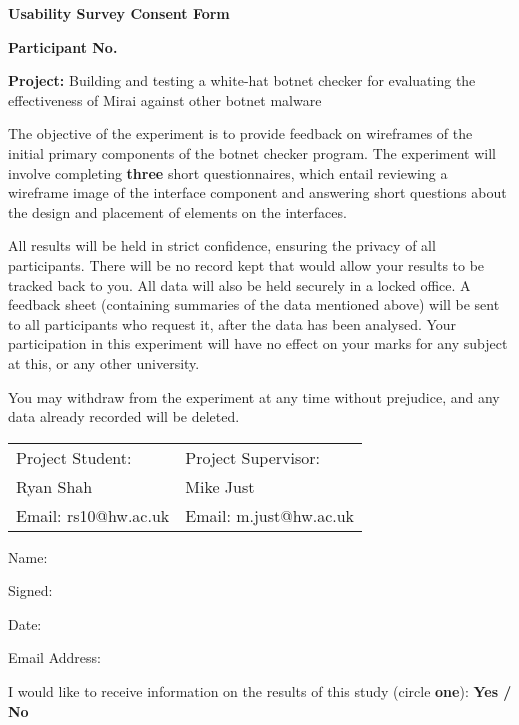 \begin{center}
	\textbf{Usability Survey Consent Form}\par
	\textbf{Participant No.}\par
	\textbf{Project:} Building and testing a white-hat botnet checker for evaluating the effectiveness of Mirai against other botnet malware
\end{center}

The objective of the experiment is to provide feedback on wireframes of the initial primary components of the botnet checker program. The experiment will involve completing \textbf{three} short questionnaires, which entail reviewing a wireframe image of the interface component and answering short questions about the design and placement of elements on the interfaces.

\vspace{0.5cm}

All results will be held in strict confidence, ensuring the privacy of all participants. There will be no record kept that would allow your results to be tracked back to you. All data will also be held securely in a locked office. A feedback sheet (containing summaries of the data mentioned above) will be sent to all participants who request it, after the data has been analysed. Your participation in this experiment will have no effect on your marks for any subject at this, or any other university.

\vspace{0.5cm}

You may withdraw from the experiment at any time without prejudice, and any data already recorded will be deleted.

\vspace{0.5cm}

\begin{table}[h]
\centering
\begin{tabular}{ll}
\hline
Project Student:     & Project Supervisor:    \\
Ryan Shah            & Mike Just              \\
Email: rs10@hw.ac.uk & Email: m.just@hw.ac.uk \\ \hline
\end{tabular}
\end{table}

Name:\par
Signed:\par
Date:\par
Email Address:\par

\vspace{0.5cm}

I would like to receive information on the results of this study (circle \textbf{one}): \textbf{Yes / No}
